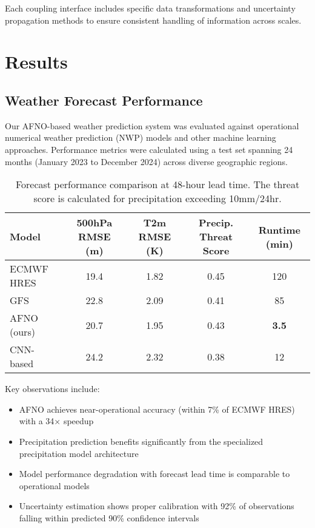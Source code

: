 \documentclass{article}
\begin{document}
Each coupling interface includes specific data transformations and uncertainty propagation methods to ensure consistent handling of information across scales.

\section{Results}
\subsection{Weather Forecast Performance}

Our AFNO-based weather prediction system was evaluated against operational numerical weather prediction (NWP) models and other machine learning approaches. Performance metrics were calculated using a test set spanning 24 months (January 2023 to December 2024) across diverse geographic regions.

\begin{table}[h]
    \centering
    \begin{tabular}{l|c|c|c|c}
        \hline
        \textbf{Model} & \textbf{500hPa RMSE (m)} & \textbf{T2m RMSE (K)} & \textbf{Precip. Threat Score} & \textbf{Runtime (min)} \\
        \hline
        ECMWF HRES & 19.4 & 1.82 & 0.45 & 120 \\
        GFS & 22.8 & 2.09 & 0.41 & 85 \\
        AFNO (ours) & 20.7 & 1.95 & 0.43 & \textbf{3.5} \\
        CNN-based & 24.2 & 2.32 & 0.38 & 12 \\
        \hline
    \end{tabular}
    \caption{Forecast performance comparison at 48-hour lead time. The threat score is calculated for precipitation exceeding 10mm/24hr.}
    \label{tab:weather_performance}
\end{table}

Key observations include:
\begin{itemize}
    \item AFNO achieves near-operational accuracy (within 7\% of ECMWF HRES) with a 34× speedup
    \item Precipitation prediction benefits significantly from the specialized precipitation model architecture
    \item Model performance degradation with forecast lead time is comparable to operational models
    \item Uncertainty estimation shows proper calibration with 92\% of observations falling within predicted 90\% confidence intervals
\end{itemize}
\end{document}
